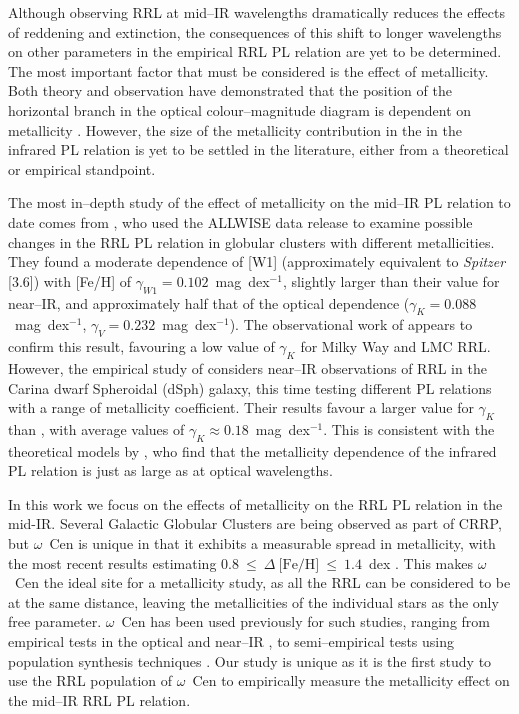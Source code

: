 \documentclass[a4paper,fleqn,usenatbib]{mnras}
\begin{document}
Although observing RRL at mid--IR wavelengths dramatically reduces the effects of reddening and extinction, the consequences of this shift to longer wavelengths on other parameters in the empirical RRL PL relation are yet to be determined. The most important factor that must be considered is the effect of metallicity. Both theory and observation have demonstrated that the position of the horizontal branch in the optical colour--magnitude diagram is dependent on metallicity \citep[e.g.][]{2015ApJ...808...50M, 2004ApJS..154..633C, 2003MNRAS.344.1097B, 1994AJ....108..222N}. However, the size of the metallicity contribution in the in the infrared PL relation is yet to be settled in the literature, either from a theoretical or empirical standpoint. 

The most in--depth study of the effect of metallicity on the mid--IR PL relation to date comes from \citet{2015PKAS...30..183D}, who used the ALLWISE data release \citep{2010AJ....140.1868W, 2014yCat.2328....0C} to examine possible changes in the RRL PL relation in globular clusters with different metallicities. They found a moderate dependence of [W1] (approximately equivalent to {\it Spitzer} [3.6]) with [Fe/H] of $\gamma_{W1} = 0.102$~mag~dex$^{-1}$, slightly larger than their value for near--IR, and approximately half that of the optical dependence ($\gamma_{K} = 0.088$~mag~dex$^{-1}$, $\gamma_{V} = 0.232$~mag~dex$^{-1}$). The observational work of \citet{2015ApJ...807..127M} appears to confirm this result, favouring a low value of $\gamma_K$ for Milky Way and LMC RRL. However, the empirical study of \citet{2015AJ....150...90K} considers near--IR observations of RRL in the Carina dwarf Spheroidal (dSph) galaxy, this time testing different PL relations with a range of metallicity coefficient. Their results favour a larger value for $\gamma_K$ than \citet{2015PKAS...30..183D}, with average values of $\gamma_K \approx 0.18$~mag~dex$^{-1}$. This is consistent with the theoretical models by \citet{2015ApJ...808...50M}, who find that the metallicity dependence of the infrared PL relation is just as large as at optical wavelengths.

In this work we focus on the effects of metallicity on the RRL PL relation in the mid-IR. Several Galactic Globular Clusters are being observed as part of CRRP, but $\omega$~Cen is unique in that it exhibits a measurable spread in metallicity, with the most recent results estimating $0.8~\leq~\Delta~\text{[Fe/H]}~\leq~1.4$~dex \citep{2014ApJ...791..107V, 2012ApJ...746...14M, 2010ApJ...722.1373J}. This makes $\omega$~Cen the ideal site for a metallicity study, as all the RRL can be considered to be at the same distance, leaving the metallicities of the individual stars as the only free parameter. $\omega$~Cen has been used previously for such studies, ranging from empirical tests in the optical \citep[e.g.][]{2003MNRAS.345...86O, 1991ApJ...373L..43L} and near--IR \citep[e.g.][]{2006MmSAI..77..245C, 2006ApJ...652..362D}, to semi--empirical tests using population synthesis techniques \citep{2016MNRAS.tmp..104T}. Our study is unique as it is the first study to use the RRL population of $\omega$~Cen to empirically measure the metallicity effect on the mid--IR RRL PL relation.
\end{document}
